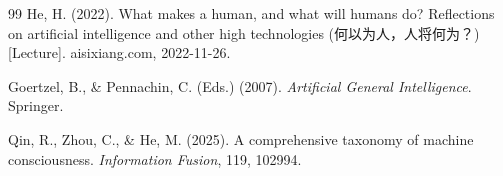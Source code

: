\documentclass[10pt]{article}
\begin{document}
\begin{thebibliography}{99}
He, H. (2022).
What makes a human, and what will humans do? Reflections on artificial intelligence and other high technologies (何以为人，人将何为？) [Lecture].
aisixiang.com, 2022-11-26.

Goertzel, B., \& Pennachin, C. (Eds.) (2007).
\emph{Artificial General Intelligence}.
Springer.

Qin, R., Zhou, C., \& He, M. (2025).
A comprehensive taxonomy of machine consciousness.
\emph{Information Fusion}, 119, 102994.

\end{thebibliography}
\end{document}
